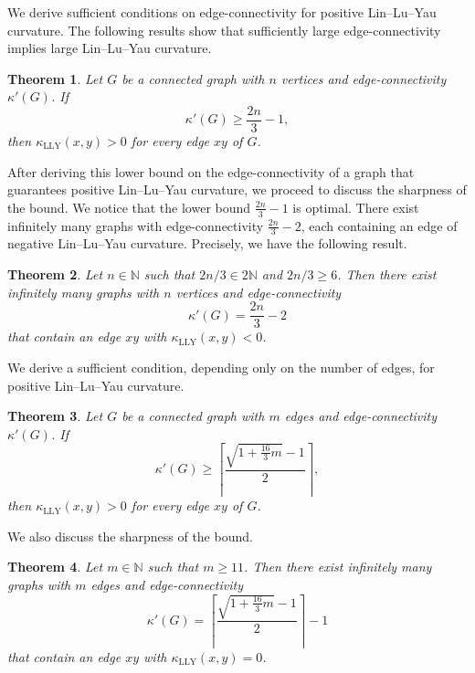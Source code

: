 \documentclass[10pt,a4paper]{article}
\newtheorem{theorem}{Theorem}[section]
\theoremstyle{definition}
\theoremstyle{definition}
\theoremstyle{nonumber}
\begin{document}
We derive sufficient conditions on edge-connectivity for positive Lin--Lu--Yau curvature.
The following results show that sufficiently large edge-connectivity implies large Lin--Lu--Yau curvature.


\begin{theorem}\label{n bound}
Let $G$ be a connected graph with $n$ vertices and edge-connectivity $\kappa'(G)$. If 
$$
\kappa'(G)\ge \frac{2n}{3}-1,
$$ 
then $\kappa_{\mathrm{LLY}}(x,y)>0$ for every edge $xy$ of $G$.
\end{theorem}


After deriving this lower bound on the edge-connectivity of a graph that guarantees positive Lin--Lu--Yau curvature, we proceed to discuss the sharpness of the bound.
We notice that the lower bound $\frac{2n}{3}-1$ is optimal. There exist infinitely many graphs with edge-connectivity $\frac{2n}{3}-2$, each containing an edge of negative Lin--Lu--Yau curvature. Precisely, we have the following result.


\begin{theorem}\label{n bound sharpness}
Let $n \in \mathbb{N}$ such that $2n/3 \in 2\mathbb{N}$ and $2n/3 \geq 6$. Then there exist infinitely many graphs with $n$ vertices and edge-connectivity 
$$
\kappa'(G) = \frac{2n}{3} - 2
$$ 
that contain an edge $xy$ with $\kappa_{\mathrm{LLY}}(x, y) < 0$.
\end{theorem}


We derive a sufficient condition, depending only on the number of edges, for positive Lin--Lu--Yau curvature.


\begin{theorem}\label{m bound}
Let $G$ be a connected graph with $m$ edges and edge-connectivity $\kappa'(G)$. If $$
\kappa'(G)\ge \left\lceil\frac{\sqrt{1+\frac{16}{3}m}-1}{2}
\right\rceil,
$$ 
then $\kappa_{\mathrm{LLY}}(x,y)>0$ for every edge $xy$ of $G$.
\end{theorem}


We also discuss the sharpness of the bound.


\begin{theorem}\label{m bound sharpness}
Let $m \in \mathbb{N}$ such that $m \geq 11$. Then there exist infinitely many graphs with $m$ edges and edge-connectivity 
$$
\kappa'(G)=\left\lceil\frac{\sqrt{1+\frac{16}{3}m}-1}{2}\right\rceil-1
$$ 
that contain an edge $xy$ with $\kappa_{\mathrm{LLY}}(x, y) = 0$.
\end{theorem}
\end{document}
